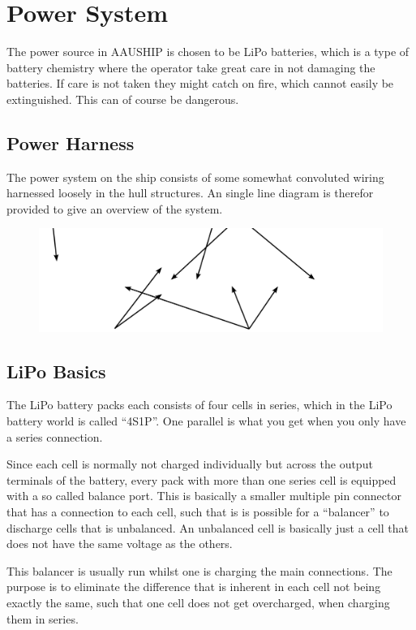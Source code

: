 \section{Power System}

The power source in AAUSHIP is chosen to be LiPo batteries, which is
a type of battery chemistry where the operator take great care in not damaging
the batteries. If care is not taken they might catch on fire, which
cannot easily be extinguished. This can of course be dangerous.

\subsection{Power Harness}
The power system on the ship consists of some somewhat convoluted
wiring harnessed loosely in the hull structures. An single line
diagram is therefor provided to give an overview of the system.

\begin{figure}[htbp]
	\includegraphics[width=\textwidth]{fig/harness}
\end{figure}

\subsection{LiPo Basics}
The LiPo battery packs each consists of four cells in series, which in
the LiPo battery world is called ``4S1P''. One parallel is what you get
when you only have a series connection.

Since each cell is normally not charged individually but across the
output terminals of the battery, every pack with more than one series
cell is equipped with a so called balance port. This is basically a
smaller multiple pin connector that has a connection to each cell,
such that is is possible for a ``balancer'' to discharge cells that is
unbalanced. An unbalanced cell is basically just a cell that does not
have the same voltage as the others.

This balancer is usually run whilst one is charging the main
connections. The purpose is to eliminate the difference that is
inherent in each cell not being exactly the same, such that one cell
does not get overcharged, when charging them in series.


